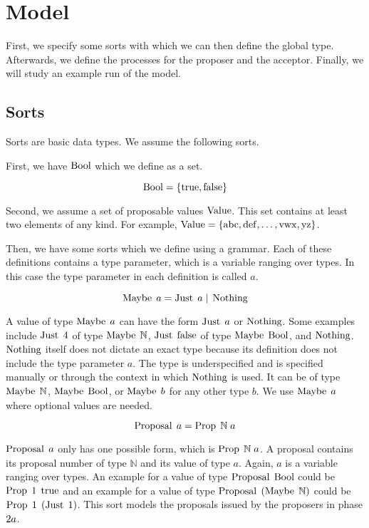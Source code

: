 \chapter{Model}
First, we specify some sorts with which we can then define the global type.
Afterwards, we define the processes for the proposer and the acceptor.
Finally, we will study an example run of the model.

\section{Sorts}
Sorts are basic data types.
We assume the following sorts.

First, we have $\operatorname{Bool}$ which we define as a set.

\[\operatorname{Bool} = \left\{\operatorname{true}, \operatorname{false}\right\}\]

Second, we assume a set of proposable values $\operatorname{Value}$.
This set contains at least two elements of any kind.
For example, $\operatorname{Value}=\left\{\operatorname{abc}, \operatorname{def}, \ldots, \operatorname{vwx}, \operatorname{yz}\right\}$.

Then, we have some sorts which we define using a grammar.
Each of these definitions contains a type parameter, which is a variable ranging over types.
In this case the type parameter in each definition is called $a$.

\[\operatorname{Maybe}\; a = \operatorname{Just}\; a \; | \; \operatorname{Nothing}\]

A value of type $\operatorname{Maybe}\; a$ can have the form $\operatorname{Just}\; a$ or $\operatorname{Nothing}$.
Some examples include $\operatorname{Just}\; 4$ of type $\operatorname{Maybe}\; \mathbb{N}$, $\operatorname{Just}\; \operatorname{false}$ of type $\operatorname{Maybe}\; \operatorname{Bool}$, and $\operatorname{Nothing}$.
$\operatorname{Nothing}$ itself does not dictate an exact type because its definition does not include the type parameter $a$.
The type is underspecified and is specified manually or through the context in which $\operatorname{Nothing}$ is used.
It can be of type $\operatorname{Maybe}\; \mathbb{N}$, $\operatorname{Maybe}\; \operatorname{Bool}$, or $\operatorname{Maybe}\; b$ for any other type $b$.
We use $\operatorname{Maybe}\; a$ where optional values are needed.

\[\operatorname{Proposal}\; a = \operatorname{Prop}\; \mathbb{N}\; a\]

$\operatorname{Proposal}\; a$ only has one possible form, which is $\operatorname{Prop}\; \mathbb{N}\; a$.
A proposal contains its proposal number of type $\mathbb{N}$ and its value of type $a$.
Again, $a$ is a variable ranging over types.
An example for a value of type $\operatorname{Proposal}\; \operatorname{Bool}$ could be $\operatorname{Prop}\; 1\; \operatorname{true}$ and an example for a value of type $\operatorname{Proposal}\; \left(\operatorname{Maybe}\; \mathbb{N}\right)$ could be $\operatorname{Prop}\; 1\; \left(\operatorname{Just}\; 1\right)$.
This sort models the proposals issued by the proposers in phase $2a$.

